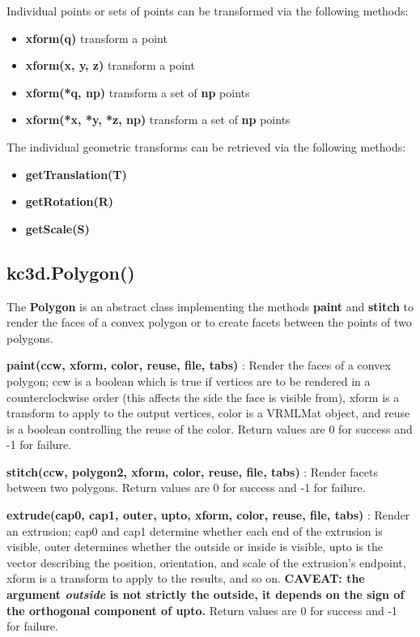 \documentclass[a4paper, dvipdfm]{article}
\begin{document}
Individual points or sets of points can be transformed via the following methods:

\begin{itemize}
\item \textbf{xform(q)} transform a point\\
\item \textbf{xform(x, y, z)} transform a point\\
\item \textbf{xform(*q, np)} transform a set of \textbf{np} points\\
\item \textbf{xform(*x, *y, *z, np)} transform a set of \textbf{np} points\\
\end{itemize}

The individual geometric transforms can be retrieved via the following methods:

\begin{itemize}
\item \textbf{getTranslation(T)}\\
\item \textbf{getRotation(R)}\\
\item \textbf{getScale(S)}\\
\end{itemize}

\subsection{kc3d.Polygon()}
The \textbf{Polygon} is an abstract class implementing the methods \textbf{paint}
and \textbf{stitch} to render the faces of a convex polygon or to create facets
between the points of two polygons.

\textbf{paint(ccw, xform, color, reuse, file, tabs)} : Render the faces of a convex polygon;
ccw is a boolean which is true if vertices are to be rendered in a counterclockwise order (this
affects the side the face is visible from), xform is a transform to apply to the output vertices,
color is a VRMLMat object, and reuse is a boolean controlling the reuse of the color.
Return values are 0 for success and -1 for failure.

\textbf{stitch(ccw, polygon2, xform, color, reuse, file, tabs)} : Render facets between two
polygons. Return values are 0 for success and -1 for failure.

\textbf{extrude(cap0, cap1, outer, upto, xform, color, reuse, file, tabs)} : 
Render an extrusion; cap0 and cap1 determine whether each end of the extrusion is
visible, outer determines whether the outside or inside is visible,
upto is the vector describing the position, orientation, and scale of the extrusion's
endpoint, xform is a transform to apply to the results, and so on.
\textbf{CAVEAT: the argument \emph{outside} is not strictly the outside,
it depends on the sign of the orthogonal component of upto.}
Return values are 0 for success and -1 for failure.
\end{document}
